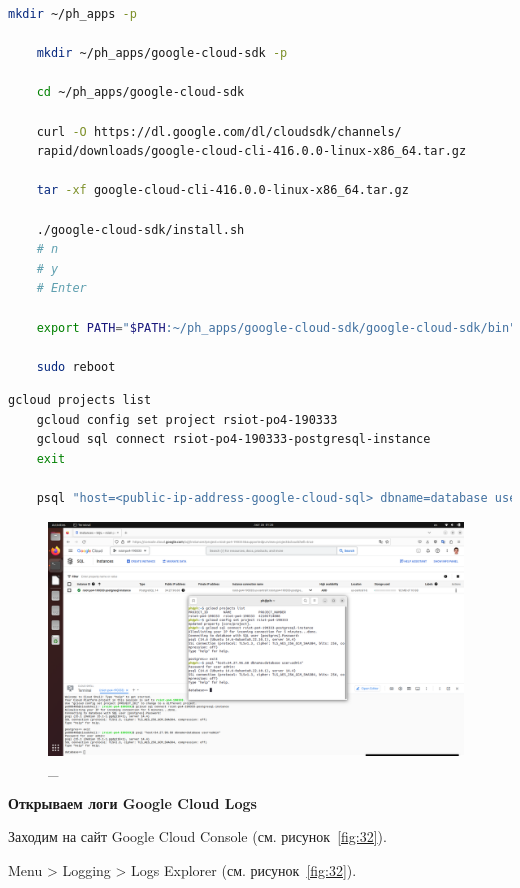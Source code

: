 \documentclass[12pt, a4paper, simple]{eskdtext}
\begin{document}
  \begin{lstlisting}[language=bash,name=Устанавливаю gcloud на ноутбук]
    mkdir ~/ph_apps -p

    mkdir ~/ph_apps/google-cloud-sdk -p

    cd ~/ph_apps/google-cloud-sdk

    curl -O https://dl.google.com/dl/cloudsdk/channels/
    rapid/downloads/google-cloud-cli-416.0.0-linux-x86_64.tar.gz

    tar -xf google-cloud-cli-416.0.0-linux-x86_64.tar.gz

    ./google-cloud-sdk/install.sh
    # n
    # y
    # Enter

    export PATH="$PATH:~/ph_apps/google-cloud-sdk/google-cloud-sdk/bin"

    sudo reboot
  \end{lstlisting}

  \begin{lstlisting}[language=bash,name=Подключаюсь к БД через ноутбук]
    gcloud projects list
    gcloud config set project rsiot-po4-190333
    gcloud sql connect rsiot-po4-190333-postgresql-instance
    exit

    psql "host=<public-ip-address-google-cloud-sql> dbname=database user=admin"
  \end{lstlisting}

  \begin{figure}[!h]
    \centering
    \includegraphics[width=11cm]
    {images/2023-02-26_01-26-15.png}
    \caption{\_}
    \label{fig:31}
  \end{figure}

  \newpage
  \textbf{Открываем логи Google Cloud Logs}

  Заходим на сайт Google Cloud Console \cite{GoogleCloudConsole} (см. рисунок~\ref{fig:32}).

  Menu > Logging > Logs Explorer \cite{GoogleCloudLogs} (см. рисунок~\ref{fig:32}).
\end{document}
